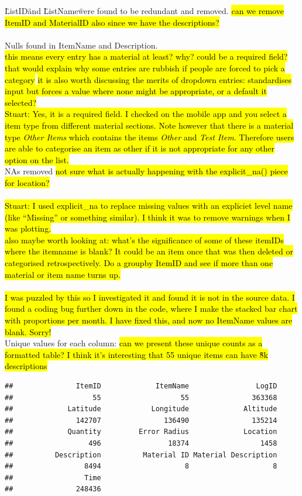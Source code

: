 \documentclass[10pt]{article}\usepackage[]{graphicx}\usepackage[]{color}
\makeatletter
\newenvironment{kframe}{%
 \def\at@end@of@kframe{}%
 \ifinner\ifhmode%
  \def\at@end@of@kframe{\end{minipage}}%
  \begin{minipage}{\columnwidth}%
 \fi\fi%
 \def\FrameCommand##1{\hskip\@totalleftmargin \hskip-\fboxsep
 \colorbox{shadecolor}{##1}\hskip-\fboxsep
     \hskip-\linewidth \hskip-\@totalleftmargin \hskip\columnwidth}%
 \MakeFramed {\advance\hsize-\width
   \@totalleftmargin\z@ \linewidth\hsize
   \@setminipage}}%
 {\par\unskip\endMakeFramed%
 \at@end@of@kframe}
\newenvironment{knitrout}{}{} %
\makeatother
\begin{document}
\"ListID\" and \"ListName\" were found to be redundant and removed. \hl{can we remove ItemID and MaterialID also since we have the descriptions?}\\
\\
Nulls found in ItemName and Description.\\ 
\hl{this means every entry has a material at least? why? could be a required field? that would explain why some entries are rubbish if people are forced to pick a category}
\hl{it is also worth discussing the merits of dropdown entries: standardises input but forces a value where none might be appropriate, or a default it selected?}
\\
\hl{Stuart: Yes, it is a required field. I checked on the mobile app and you select a item type from different material sections. Note however that there is a material type \emph{Other Items} which contains the items \emph{Other} and \emph{Test Item}. Therefore users are able to categorise an item as other if it is not appropriate for any other option on the list.}
\\
NAs removed \hl{not sure what is actually happening with the explicit\_na() piece for location?}\\
\\
\hl{Stuart: I used explicit\_na to replace missing values with an expliciet level name (like ``Missing'' or something similar). I think it was to remove warnings when I was plotting.}
\\
\hl{also maybe worth looking at: what's the significance of some of these itemIDs where the itemname is blank? It could be an item once that was then deleted or categorised retrospectively. Do a groupby ItemID and see if more than one material or item name turns up.}\\
\\
\hl{I was puzzled by this so I investigated it and found it is not in the source data. I found a coding bug further down in the code, where I make the stacked bar chart with proportions per month. I have fixed this, and now no ItemName values are blank. Sorry!}
\\
Unique values for each column: \hl{can we present these unique counts as a formatted table? I think it's interesting that 55 unique items can have \~8k descriptions}
\begin{knitrout}
\color{fgcolor}\begin{kframe}
\begin{verbatim}
##               ItemID             ItemName                LogID 
##                   55                   55               363368 
##             Latitude            Longitude             Altitude 
##               142707               136490               135214 
##             Quantity         Error Radius             Location 
##                  496                18374                 1458 
##          Description          Material ID Material Description 
##                 8494                    8                    8 
##                 Time 
##               248436
\end{verbatim}
\end{kframe}
\end{knitrout}
\end{document}
